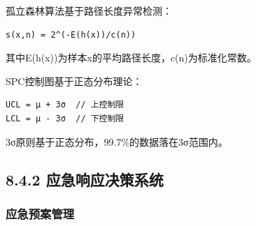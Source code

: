 
孤立森林算法基于路径长度异常检测：

\begin{lstlisting}
s(x,n) = 2^(-E(h(x))/c(n))
\end{lstlisting}

其中E(h(x))为样本x的平均路径长度，c(n)为标准化常数。


SPC控制图基于正态分布理论：

\begin{lstlisting}
UCL = μ + 3σ  // 上控制限
LCL = μ - 3σ  // 下控制限
\end{lstlisting}

3σ原则基于正态分布，99.7\%的数据落在3σ范围内。

\hypertarget{ux5e94ux6025ux54cdux5e94ux51b3ux7b56ux7cfbux7edf}{%
\subsection{8.4.2 应急响应决策系统}\label{ux5e94ux6025ux54cdux5e94ux51b3ux7b56ux7cfbux7edf}}

\hypertarget{ux5e94ux6025ux9884ux6848ux7ba1ux7406}{%
\subsubsection{应急预案管理}\label{ux5e94ux6025ux9884ux6848ux7ba1ux7406}}

